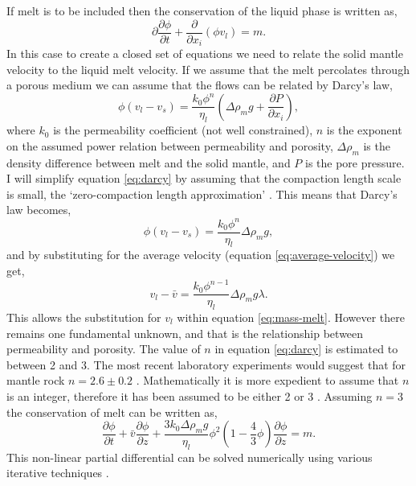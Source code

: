 If melt is to be included then the conservation of the liquid phase is written as,
\begin{equation}
\partial
\frac{\partial \phi}{\partial t} + \frac{\partial}{\partial x_{i}}\left( \phi v_{l} \right) = m.
\label{eq:mass-melt}
\end{equation}
In this case to create a closed set of equations we need to relate the solid mantle velocity to the liquid melt velocity. If we assume that the melt percolates through a porous medium we can assume that the flows can be related by Darcy's law,
\begin{equation}
\phi\left( v_{l}-v_{s} \right) = \frac{k_{0}\phi^{n}}{\eta_{l}}\left( \Delta\rho_{m}g + \frac{\partial P}{\partial x_{i}} \right),
\label{eq:darcy}
\end{equation}
where $k_{0}$ is the permeability coefficient (not well constrained), $n$ is the exponent on the assumed power relation between permeability and porosity, $\Delta\rho_{m}$ is the density difference between melt and the solid mantle, and $P$ is the pore pressure. I will simplify equation \ref{eq:darcy} by assuming that the compaction length scale is small, the `zero-compaction length approximation' \citep{ribe-1985}. This means that Darcy's law becomes,
\begin{equation}
\phi\left( v_{l}-v_{s} \right) = \frac{k_{0}\phi^{n}}{\eta_{l}}\Delta\rho_{m}g,
\end{equation}
and by substituting for the average velocity (equation \ref{eq:average-velocity}) we get,
\begin{equation}
v_{l}-\bar{v} = \frac{k_{0}\phi^{n-1}}{\eta_{l}}\Delta\rho_{m}g\lambda.
\end{equation}
This allows the substitution for $v_{l}$ within equation \ref{eq:mass-melt}. However there remains one fundamental unknown, and that is the relationship between permeability and porosity. The value of $n$ in equation \ref{eq:darcy} is estimated to between 2 and 3. The most recent laboratory experiments would suggest that for mantle rock $n = 2.6\pm0.2$ \citep{miller-etal-2014}. Mathematically it is more expedient to assume that $n$ is an integer, therefore it has been assumed to be either 2 \citep[e.g.][]{scott-1989,goes-etal-2012} or 3 \citep[e.g.][]{hewitt-2010,armitage-etal-grl-2019}. Assuming $n=3$ the conservation of melt can be written as,
\begin{equation}
\frac{\partial \phi}{\partial t} + \bar{v}\frac{\partial \phi}{\partial z} + \frac{3k_{0}\Delta\rho_{m}g}{\eta_{l}}\phi^{2}\left( 1-\frac{4}{3}\phi \right)\frac{\partial \phi}{\partial z} = m.
\end{equation}
This non-linear partial differential can be solved numerically using various iterative techniques \citep[e.g.][]{armitage-etal-grl-2019,franken-etal-2020}.

